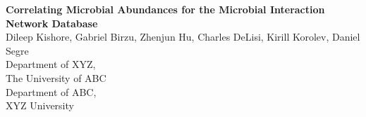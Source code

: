 
\begin{titlepage}

  \newcommand{\HRule}{\rule{\linewidth}{0.5mm}} %

  \center %





  \vspace{3.5 cm}
  { \huge \bfseries Correlating Microbial Abundances for the Microbial Interaction Network Database}\\[0.4cm] %


  \vspace{1.5 cm}
  Dileep Kishore, Gabriel Birzu, Zhenjun Hu, Charles DeLisi, Kirill Korolev, Daniel Segre\\
  \vspace{1cm}
  Department of XYZ,\\
  The University of ABC\\
  Department of ABC,\\
  XYZ University\\




\vfill %

\end{titlepage}


\newpage
